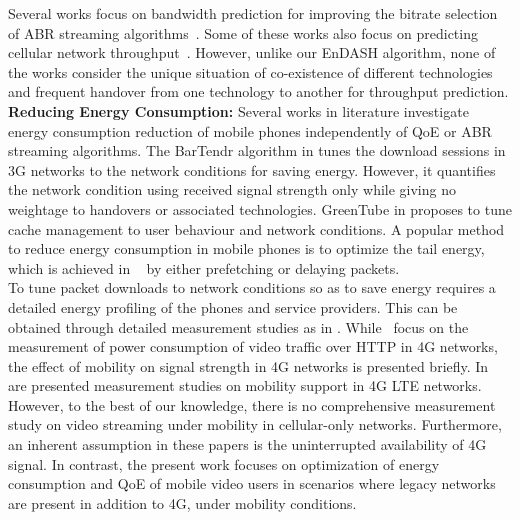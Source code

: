 Several works focus on bandwidth prediction for improving the bitrate selection of  ABR streaming algorithms~\cite{Bentaleb2019,Raca2019,Raca2018_2,yue2018linkforecast}. Some of these works also focus on predicting cellular network throughput~\cite{Raca2019,yue2018linkforecast,Raca2017,Raca2018_2,Raca2018_3,Samba2017, Ghasemi2018}. However, unlike our EnDASH algorithm, none of the works consider the unique situation of co-existence of different technologies and frequent handover from one technology to another for throughput prediction.\\ %
\noindent\textbf{Reducing Energy Consumption:} Several works in literature investigate energy consumption reduction of mobile phones independently of QoE or ABR streaming algorithms. The BarTendr algorithm in \cite{Schulman2010}  tunes the download sessions in 3G networks to the network conditions for saving energy. However, it quantifies the network condition using received signal strength only while giving no weightage to handovers or associated technologies. GreenTube in \cite{Xin2012} proposes to tune cache management to user behaviour and network conditions. A popular method to reduce energy consumption in mobile phones is to optimize the tail energy, which is achieved in ~\cite{Yang2018} by either prefetching or delaying packets. \\
\indent To tune packet downloads to network conditions so as to save energy requires a detailed energy profiling of the phones and service providers. This can be obtained through detailed measurement studies as in \cite{Huang2012}. While~\cite{Zhang2018M,Zhang2016,Zhang2016DASH,Khokar2019} focus on the measurement of power consumption of video traffic over HTTP in \ac{4G} networks, the effect of  mobility on signal strength  in \ac{4G} networks is presented briefly. In~\cite{Huang2012, Deng2018} are presented  measurement studies on mobility support in \ac{4G} \ac{LTE} networks. However, to the best of our knowledge, there is no comprehensive measurement study on video streaming under mobility in cellular-only networks. Furthermore, an inherent assumption in these papers is the uninterrupted availability of 4G signal. In contrast, the present work focuses on optimization of energy consumption and \ac{QoE} of mobile video users in scenarios where legacy networks are present in addition to 4G, under mobility conditions.
